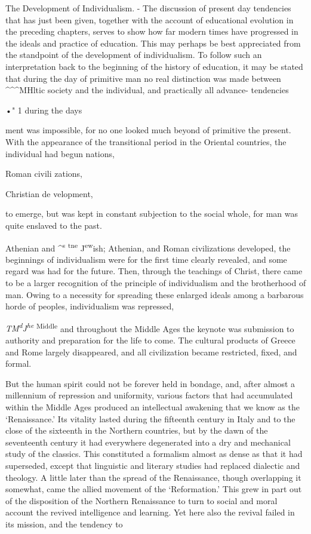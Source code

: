 \documentclass[
]{book}
\begin{document}
The Development of Individualism. - The discussion of present day tendencies that has just been given, together with the account of educational evolution in the preceding chapters, serves to show how far modern times have progressed in the ideals and practice of education. This may perhaps be best appreciated from the standpoint of the development of individualism. To follow such an interpretation back to the beginning of the history of education, it may be stated that during the day of primitive man no real distinction was made between \^{}\^{}\^{}MHltic society and the individual, and practically all advance- tendencies

•" 1 during the days

ment was impossible, for no one looked much beyond of primitive the present. With the appearance of the transitional period in the Oriental countries, the individual had begun nations,

Roman civili zations,

Christian de velopment,

to emerge, but was kept in constant subjection to the social whole, for man was quite enslaved to the past.

Athenian and \^{}\textsuperscript{s} \textsuperscript{tne} J\textsuperscript{ew}ish; Athenian, and Roman civilizations developed, the beginnings of individualism were for the first time clearly revealed, and some regard was had for the future. Then, through the teachings of Christ, there came to be a larger recognition of the principle of individualism and the brotherhood of man. Owing to a necessity for spreading these enlarged ideals among a barbarous horde of peoples, individualism was repressed,

\emph{TM\textsuperscript{d}J\textsuperscript{he}} \textsuperscript{Middle} and throughout the Middle Ages the keynote was submission to authority and preparation for the life to come. The cultural products of Greece and Rome largely disappeared, and all civilization became restricted, fixed, and formal.

But the human spirit could not be forever held in bondage, and, after almost a millennium of repression and uniformity, various factors that had accumulated within the Middle Ages produced an intellectual awakening that we know as the `Renaissance.' Its vitality lasted during the fifteenth century in Italy and to the close of the sixteenth in the Northern countries, but by the dawn of the seventeenth century it had everywhere degenerated into a dry and mechanical study of the classics. This constituted a formalism almost as dense as that it had superseded, except that linguistic and literary studies had replaced dialectic and theology. A little later than the spread of the Renaissance, though overlapping it somewhat, came the allied movement of the `Reformation.' This grew in part out of the disposition of the Northern Renaissance to turn to social and moral account the revived intelligence and learning. Yet here also the revival failed in its mission, and the tendency to
\end{document}
